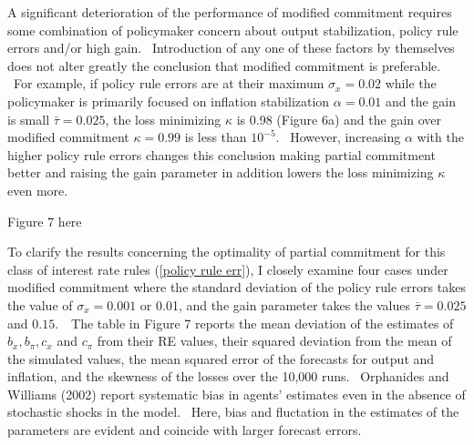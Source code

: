 \documentclass{article}
\begin{document}
\begin{doublespace}
A significant deterioration of the performance of modified commitment
requires some combination of policymaker concern about output stabilization,
policy rule errors and/or high gain. \ Introduction of any one of these
factors by themselves does not alter greatly the conclusion that modified
commitment is preferable. \ For example, if policy rule errors are at their
maximum $\sigma _{x}=0.02$ while the policymaker is primarily focused on
inflation stabilization $\alpha =0.01$ and the gain is small $\bar{\tau}%
=0.025$, the loss minimizing $\kappa $ is 0.98 (Figure 6a) and the gain over
modified commitment $\kappa =0.99$ is less than $10^{-5}$. \ However,
increasing $\alpha $ with the higher policy rule errors changes this
conclusion making partial commitment better and raising the gain parameter
in addition lowers the loss minimizing $\kappa $ even more.

\begin{center}
Figure 7 here
\end{center}

To clarify the results concerning the optimality of partial commitment for
this class of interest rate rules (\ref{policy rule err}), I closely examine
four cases under modified commitment where the standard deviation of the
policy rule errors takes the value of $\sigma _{x}=0.001$ or 0.01, and the
gain parameter takes the values $\bar{\tau}=0.025$ and $0.15$.\ \ The table
in Figure 7 reports the mean deviation of the estimates of $b_{x},b_{\pi 
},c_{x}$ and $c_{\pi }$ from their RE values, their squared deviation from
the mean of the simulated values, the mean squared error of the forecasts
for output and inflation, and the skewness of the losses over the 10,000
runs. \ Orphanides and Williams (2002) report systematic bias in agents'
estimates even in the absence of stochastic shocks in the model. \ Here,
bias and fluctation in the estimates of the parameters are evident and
coincide with larger forecast errors.


\end{doublespace}
\end{document}
